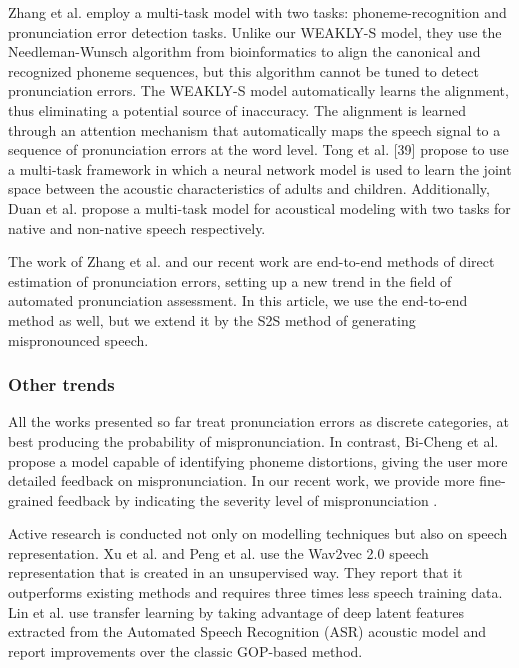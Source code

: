 \documentclass[]{interact}
\theoremstyle{plain}%
\theoremstyle{definition}
\theoremstyle{remark}
\begin{document}
Zhang et al. \cite{zhang2021text} employ a multi-task model with two tasks: phoneme-recognition and pronunciation error detection tasks. Unlike our WEAKLY-S model, they use the Needleman-Wunsch algorithm \cite{needleman1970general} from  bioinformatics to align the canonical and recognized phoneme sequences, but this algorithm cannot be tuned to detect pronunciation errors. The WEAKLY-S model automatically learns the alignment, thus eliminating a potential source of inaccuracy. The alignment is learned through an attention mechanism that automatically maps the speech signal to a sequence of pronunciation errors at the word level. Tong et al. [39] propose to use a multi-task framework in which a neural network model is used to learn the joint space between the acoustic characteristics of adults and children. Additionally, Duan et al. \cite{duan2019cross} propose a multi-task model for acoustical modeling with two tasks for native and non-native speech respectively.

The work of Zhang et al. \cite{zhang2021text} and our recent work \cite{korzekwa21b_interspeech} are end-to-end methods of direct estimation of pronunciation errors, setting up a new trend in the field of automated pronunciation assessment. In this article, we use the end-to-end method as well, but we extend it by the S2S method of generating mispronounced speech. 

\subsubsection{Other trends} 

All the works presented so far treat pronunciation errors as discrete categories, at best producing the probability of mispronunciation. In  contrast, Bi-Cheng et al. \cite{yan20_interspeech} propose a model capable of identifying phoneme distortions, giving the user more detailed feedback on mispronunciation. In our recent work, we provide more fine-grained feedback by indicating the severity level of mispronunciation \cite{korzekwa21b_interspeech}.

Active research is conducted not only on modelling techniques but also on speech representation. Xu et al. \cite{xu21k_interspeech} and Peng et al. \cite{peng21e_interspeech} use the Wav2vec 2.0 speech representation that is created in an unsupervised way. They report that it outperforms existing methods and requires three times less speech training data. Lin et al. \cite{lin21j_interspeech} use transfer learning by taking advantage of deep latent features extracted from the Automated Speech Recognition (ASR) acoustic model and report improvements over the classic GOP-based method.
\end{document}
